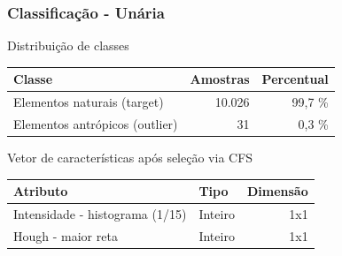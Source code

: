 \documentclass[t]{beamer}
\begin{document}
\begin{frame}[c]
	\frametitle{Classificação - Unária}
	
	\centering
	Distribuição de classes

	\small{
		\begin{table}[h]
		\centering
		\begin{tabulary}{\linewidth}{|L|R|R|}
		\hline
		\textbf{Classe} & \textbf{Amostras} & \textbf{Percentual} \\ \hline
		Elementos naturais (target)    & 10.026 & 99,7 \% \\ \hline
		Elementos antrópicos (outlier) &     31 &  0,3 \% \\ \hline
		\end{tabulary}
	\end{table}
	}

	\centering
	Vetor de características após seleção via CFS

	\small{
		\begin{table}[h]
		\centering
		\begin{tabulary}{\linewidth}{|L|L|R|}
		\hline
		\textbf{Atributo} & \textbf{Tipo} & \textbf{Dimensão} \\ \hline
		Intensidade - histograma (1/15) & Inteiro & 1x1 \\ \hline
		Hough - maior reta              & Inteiro & 1x1 \\ \hline
		\end{tabulary}
		\end{table}
	}
	
\end{frame}
\end{document}
